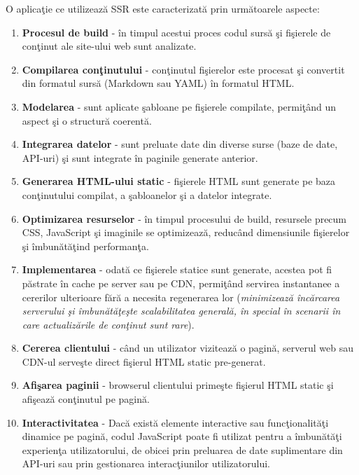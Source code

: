 \documentclass[12pt, a4paper]{report}
\begin{document}
O aplica\c tie ce utilizeaz\u a SSR este caracterizat\u a prin urm\u atoarele aspecte:
\begin{enumerate}
	\item \textbf{Procesul de build} - \^in timpul acestui proces codul surs\u a \c si fi\c sierele de con\c tinut ale site-ului web sunt analizate.
	\item \textbf{Compilarea con\c tinutului} - con\c tinutul fi\c sierelor este procesat \c si convertit din formatul surs\u a (Markdown sau YAML) \^in formatul HTML.
	\item \textbf{Modelarea} - sunt aplicate \c sabloane pe fi\c sierele compilate, permi\c t\^and un aspect \c si o structur\u a coerent\u a.
	\item \textbf{Integrarea datelor} - sunt preluate date din diverse surse (baze de date, API-uri) \c si sunt integrate \^in paginile generate anterior.
	\item \textbf{Generarea HTML-ului static} - fi\c sierele HTML sunt generate pe baza con\c tinutului compilat, a \c sabloanelor \c si a datelor integrate.
	\item \textbf{Optimizarea resurselor} - \^in timpul procesului de build, resursele precum CSS, JavaScript \c si imaginile se optimizeaz\u a, reduc\^and dimensiunile fi\c sierelor \c si \^imbun\u at\u a\c tind performan\c ta.
	\item \textbf{Implementarea} -  odat\u a ce fi\c sierele statice sunt generate, acestea pot fi p\u astrate \^in cache pe server sau pe CDN, permi\c t\^and servirea instantanee a cererilor ulterioare f\u ar\u a a necesita regenerarea lor (\textit{minimizeaz\u a \^inc\u arcarea serverului \c si \^imbun\u at\u a\c te\c ste scalabilitatea general\u a, \^in special \^in scenarii \^in care actualiz\u arile de con\c tinut sunt rare}).
	\item \textbf{Cererea clientului} -  c\^and un utilizator viziteaz\u a o pagin\u a, serverul web sau CDN-ul serve\c ste direct fi\c sierul HTML static pre-generat.
	\item \textbf{Afi\c sarea paginii} - browserul clientului prime\c ste fi\c sierul HTML static \c si afi\c seaz\u a con\c tinutul pe pagin\u a.
	\item \textbf{Interactivitatea} - Dac\u a exist\u a elemente interactive sau func\c tionalit\u a\c ti dinamice pe pagin\u a, codul JavaScript poate fi utilizat pentru a \^imbun\u at\u a\c ti experien\c ta utilizatorului, de obicei prin preluarea de date suplimentare din API-uri sau prin gestionarea interac\c tiunilor utilizatorului.
\end{enumerate}
\end{document}
